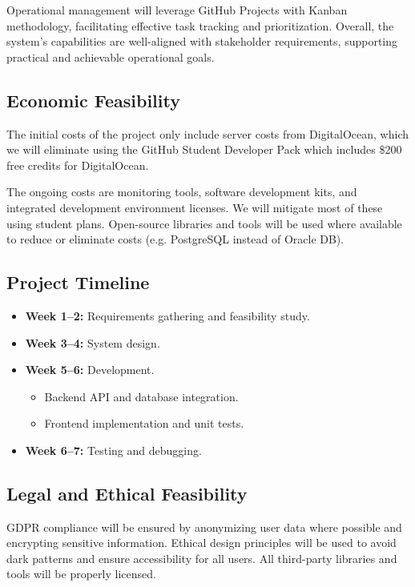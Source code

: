 \documentclass[twoside,a4paper,journal]{IEEEtran}
\begin{document}
Operational management will leverage GitHub Projects with Kanban methodology,
facilitating effective task tracking and prioritization. Overall, the system's
capabilities are well-aligned with stakeholder requirements, supporting
practical and achievable operational goals.

\subsection{Economic Feasibility}
The initial costs of the project only include server costs from DigitalOcean,
which we will eliminate using the GitHub Student Developer Pack which includes
\$200 free credits for DigitalOcean.

The ongoing costs are monitoring tools, software development kits, and
integrated development environment licenses.
We will mitigate most of these using student plans.
Open-source libraries and tools will be used where available to reduce or
eliminate costs (e.g. PostgreSQL instead of Oracle DB).

\subsection{Project Timeline}
\begin{itemize}
  \item \textbf{Week 1--2:} Requirements gathering and feasibility study.
  \item \textbf{Week 3--4:} System design.
  \item \textbf{Week 5--6:} Development.
    \begin{itemize}
      \item Backend API and database integration.
      \item Frontend implementation and unit tests.
    \end{itemize}
  \item \textbf{Week 6--7:} Testing and debugging.
\end{itemize}

\subsection{Legal and Ethical Feasibility}
GDPR compliance will be ensured by anonymizing user data where possible and
encrypting sensitive information.
Ethical design principles will be used to avoid dark patterns and ensure
accessibility for all users.
All third-party libraries and tools will be properly licensed.
\end{document}
